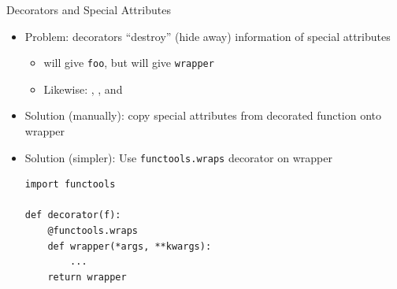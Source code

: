 
\begin{frame}[fragile]{Decorators and Special Attributes}
%
\begin{itemize}
\item Problem: decorators \enquote{destroy} (\ie hide away) information of special attributes
	\begin{itemize}
	\item {} will give \texttt{foo}, but  will give \texttt{wrapper}
	\item Likewise: , ,  and 
	\end{itemize}
	\pause
\item Solution (manually): copy special attributes from decorated function onto wrapper
	\pause
\item Solution (simpler): Use \texttt{functools.wraps} decorator on wrapper
%
\begin{codebox}
\begin{verbatim}
import functools

def decorator(f):
    @functools.wraps
    def wrapper(*args, **kwargs):
        ...
    return wrapper
\end{verbatim}
\end{codebox}
\end{itemize}
%
\end{frame}


